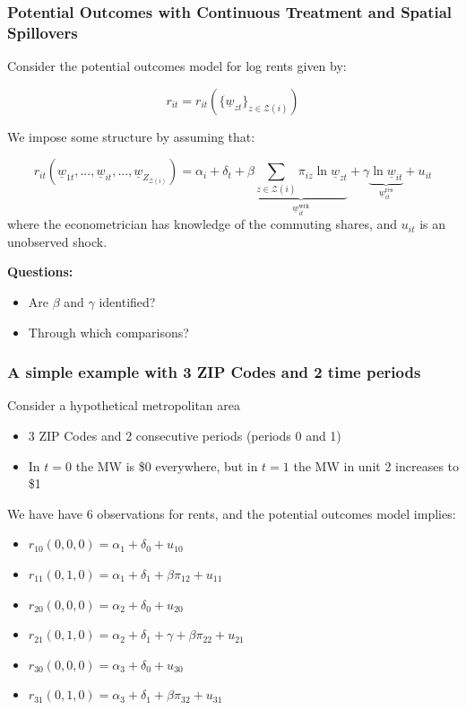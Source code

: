 \documentclass[aspectratio=169, t]{beamer}
\newcommand{\Z}{\mathcal{Z}}
\newcommand{\MW}{\underline{w}}
\begin{document}
\begin{frame}
	\frametitle{Potential Outcomes with Continuous Treatment and Spatial Spillovers}
	Consider the potential outcomes model for log rents given by:

	\[
	r_{it}=r_{it}\left(\{\underline{w}_{zt}\}_{z\in\Z(i)}\right)
	\]

	We impose some structure by assuming that:

	\[
	r_{it}(\underline{w}_{1t},...,\underline{w}_{it}, ..., \underline{w}_{Z_{\Z(i)}}) = \alpha_{i} + 
	\delta_{t} + \beta \underbrace{\sum_{z\in\Z(i)}\pi_{iz}\ln \underline{w}_{zt}}_{\MW^{\text{wrk}}_{it}} +
	\gamma \underbrace{\ln \underline{w}_{it}}_{\MW^{\text{res}}_{it}} + u_{it}
	\]
	where the econometrician has knowledge of the commuting shares, and $u_{it}$ is an unobserved shock.

	\pause 

	\vspace{2mm}

	\textbf{Questions:} 
	\begin{itemize}
		\item Are $\beta$ and $\gamma$ identified? 
		\item Through which comparisons? 
	\end{itemize}
\end{frame}

\begin{frame}
	\frametitle{A simple example with 3 ZIP Codes and 2 time periods}

	Consider a hypothetical metropolitan area
	\begin{itemize}
		\item 3 ZIP Codes and 2 consecutive periods (periods 0 and 1)
		\item In $t=0$ the MW is \$0 everywhere, but in $t=1$ the MW in unit 2 increases to \$1
	\end{itemize}

	\pause 
	\vspace{2mm}
	We have have 6 observations for rents, and the potential outcomes model implies:
	\begin{itemize}
		\item $r_{10}(0,0,0)=\alpha_{1}+\delta_{0}+u_{10}$
		\item $r_{11}(0,1,0)=\alpha_{1}+\delta_{1}+\beta\pi_{12}+u_{11}$
		\item $r_{20}(0,0,0)=\alpha_{2}+\delta_{0}+u_{20}$
		\item $r_{21}(0,1,0)=\alpha_{2}+\delta_{1}+\gamma+\beta\pi_{22}+u_{21}$
		\item $r_{30}(0,0,0)=\alpha_{3}+\delta_{0}+u_{30}$
		\item $r_{31}(0,1,0)=\alpha_{3}+\delta_{1}+\beta\pi_{32}+u_{31}$
	\end{itemize}
\end{frame}
\end{document}
